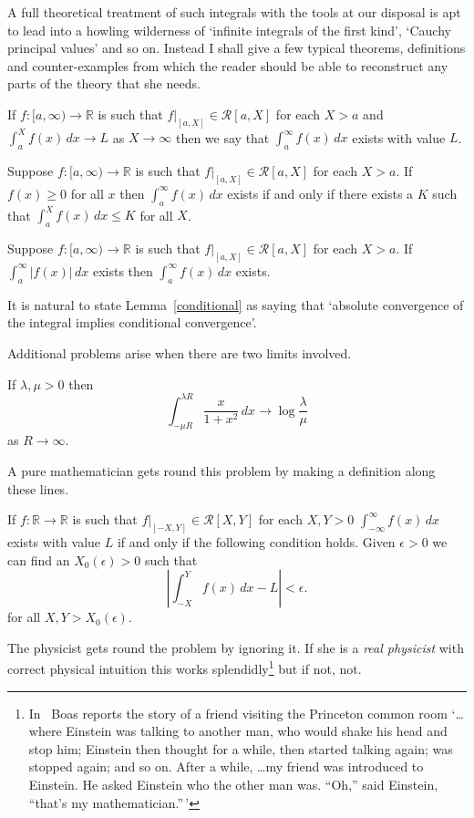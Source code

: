 A full theoretical treatment of such integrals with
the tools at our disposal is apt to lead into
a howling wilderness of `infinite integrals of the first kind',
`Cauchy principal values' and so on. Instead I shall give
a few typical theorems, definitions and counter-examples
from which the reader should be able to reconstruct
any parts of the theory that she needs.
\begin{definition} If $f:[a,\infty)\rightarrow{\mathbb R}$
is such that $f|_{[a,X]}\in{\mathcal R}[a,X]$ for each $X>a$
and $\int_{a}^{X}f(x)\,dx\rightarrow L$ as $X\rightarrow\infty$
then we say that $\int_{a}^{\infty}f(x)\,dx$ exists
with value $L$.
\end{definition}
\begin{lemma} Suppose $f:[a,\infty)\rightarrow{\mathbb R}$
is such that $f|_{[a,X]}\in{\mathcal R}[a,X]$ for each $X>a$.
If $f(x)\geq 0$ for all $x$ then
$\int_{a}^{\infty}f(x)\,dx$ exists if and only if
there exists a $K$ such that
$\int_{a}^{X}f(x)\,dx\leq K$ for all $X$.
\end{lemma}
\begin{lemma}\label{conditional}
Suppose $f:[a,\infty)\rightarrow{\mathbb R}$
is such that $f|_{[a,X]}\in{\mathcal R}[a,X]$ for each $X>a$.
If
$\int_{a}^{\infty}|f(x)|\,dx$ exists then
$\int_{a}^{\infty}f(x)\,dx$ exists.
\end{lemma}
It is natural to state Lemma~\ref{conditional} as saying
that `absolute convergence of the integral implies
conditional convergence'.

Additional problems arise when there are two limits
involved.
\begin{example} If $\lambda,\mu>0$ then
\[\int_{-\mu R}^{\lambda R}\frac{x}{1+x^{2}}\,dx
\rightarrow\log\frac{\lambda}{\mu}\]
as $R\rightarrow\infty$.
\end{example}
A pure mathematician gets round this problem
by making a definition along these lines.
\begin{definition} If $f:{\mathbb R}\rightarrow{\mathbb R}$
is such that $f|_{[-X,Y]}\in{\mathcal R}[X,Y]$ for each $X,Y>0$
$\int_{-\infty}^{\infty}f(x)\,dx$ exists
with value $L$ if and only if the following condition holds.
Given $\epsilon>0$ we can find an $X_{0}(\epsilon)>0$
such that
\[\left|\int_{-X}^{Y}f(x)\,dx-L\right|<\epsilon.\]
for all $X,Y>X_{0}(\epsilon)$.
\end{definition}
The physicist gets round the problem by ignoring it.
If she is a \emph{real physicist} with correct
physical intuition this works 
splendidly\footnote{In~\cite{Boas}
Boas reports the story of
a friend visiting the Princeton common room
`\dots where Einstein was talking to another man,
who would shake his head and stop him; Einstein
then thought for a while, then started talking
again; was stopped again; and so on. After
a while, \dots my friend was introduced to
Einstein. He asked Einstein who the other
man was. ``Oh,'' said Einstein, ``that's my mathematician.''\,'}
but if not, not.

